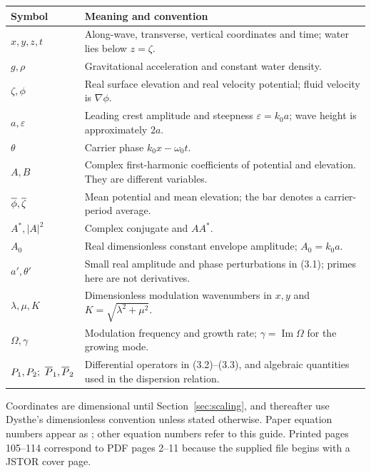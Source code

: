 \begin{longtable}{@{}p{.20\linewidth}p{.74\linewidth}@{}}
\toprule
Symbol & Meaning and convention\\
\midrule
\endhead
$x,y,z,t$ & Along-wave, transverse, vertical coordinates and time;
water lies below $z=\zeta$.\\
$g,\rho$ & Gravitational acceleration and constant water density.\\
$\zeta,\phi$ & Real surface elevation and real velocity potential;
fluid velocity is $\nabla\phi$.\\
$a,\varepsilon$ & Leading crest amplitude and steepness $\varepsilon=k_0a$;
wave height is approximately $2a$.\\
$\theta$ & Carrier phase $k_0x-\omega_0t$.\\
$A,B$ & Complex first-harmonic coefficients of potential and elevation.
They are different variables.\\
$\overline{\phi},\overline{\zeta}$ & Mean potential and mean elevation; the bar denotes a
carrier-period average.\\
$A^*,|A|^2$ & Complex conjugate and $AA^*$.\\
$A_0$ & Real dimensionless constant envelope amplitude; $A_0=k_0a$.\\
$a',\theta'$ & Small real amplitude and phase perturbations in (3.1);
primes here are not derivatives.\\
$\lambda,\mu,K$ & Dimensionless modulation wavenumbers in $x,y$ and
$K=\sqrt{\lambda^2+\mu^2}$.\\
$\Omega,\gamma$ & Modulation frequency and growth rate;
$\gamma=\operatorname{Im}\Omega$ for the growing mode.\\
$P_1,P_2;\ \Ps,\Pt$ & Differential operators in (3.2)--(3.3),
and algebraic quantities used in the dispersion relation.\\
\bottomrule
\end{longtable}

Coordinates are dimensional until Section~\ref{sec:scaling}, and thereafter
use Dysthe's dimensionless convention unless stated otherwise. Paper
equation numbers appear as ; other equation numbers refer to
this guide. Printed pages 105--114 correspond to PDF pages 2--11 because
the supplied file begins with a JSTOR cover page.
\clearpage
